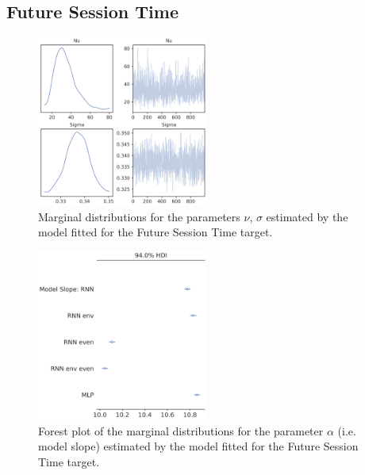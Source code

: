 \subsection{Future Session Time}
\label{future_sess_bayes_3}

\begin{figure}[H]
\centering
\includegraphics[width=0.5\textwidth]{images/appendix_C/Future Session Time_marginals_3.png}
\caption[\textbf{Future session time marginal distributions}]{Marginal distributions for the parameters $\nu$, $\sigma$ estimated by the model fitted for the Future Session Time target.}
\label{marginals_sess_3}
\end{figure}

\begin{figure}[H]
\centering
\includegraphics[width=0.5\textwidth]{images/appendix_C/Future Session Time_models_3.png}
\caption[\textbf{Future session time model fixed effect}]{Forest plot of the marginal distributions for the parameter $\alpha$ (i.e. model slope) estimated by the model fitted for the Future Session Time target.}
\label{model_sess_3}
\end{figure}

